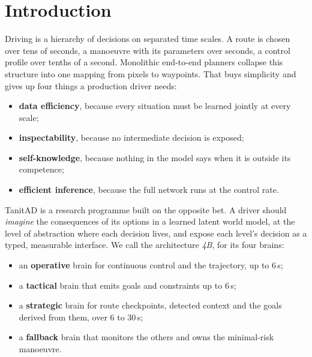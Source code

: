 \documentclass[10pt,twocolumn]{article}
\theoremstyle{remark}
\begin{document}
\section{Introduction}
Driving is a hierarchy of decisions on separated time scales. A route is chosen over tens of seconds, a manoeuvre with its
parameters over seconds, a control profile over tenths of a second. Monolithic end-to-end planners collapse this structure into one
mapping from pixels to waypoints. That buys simplicity and gives up four things a production driver needs:
\begin{itemize}
  \item \textbf{data efficiency}, because every situation must be learned jointly at every scale;
  \item \textbf{inspectability}, because no intermediate decision is exposed;
  \item \textbf{self-knowledge}, because nothing in the model says when it is outside its competence;
  \item \textbf{efficient inference}, because the full network runs at the control rate.
\end{itemize}

TanitAD is a research programme built on the opposite bet. A driver should \emph{imagine} the consequences of its options in a
learned latent world model, at the level of abstraction where each decision lives, and expose each level's decision as a typed,
measurable interface. We call the architecture \emph{4B}, for its four brains:
\begin{itemize}
  \item an \textbf{operative} brain for continuous control and the trajectory, up to 6\,s;
  \item a \textbf{tactical} brain that emits goals and constraints up to 6\,s;
  \item a \textbf{strategic} brain for route checkpoints, detected context and the goals derived from them, over 6 to 30\,s;
  \item a \textbf{fallback} brain that monitors the others and owns the minimal-risk manoeuvre.
\end{itemize}
\end{document}

